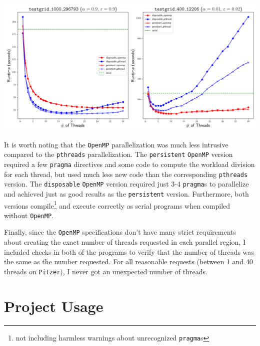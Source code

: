 \documentclass{article}
\begin{document}
\vspace{1em}
\begin{minipage}{\linewidth}
    \centering
    \includegraphics[width=.8\linewidth]{../results/plot.png}


    \label{fig:runtimes}
\end{minipage}

It is worth noting that the \texttt{OpenMP} parallelization was much less
intrusive compared to the \texttt{pthreads} parallelization. The
\texttt{persistent} \texttt{OpenMP} version required a few \texttt{pragma}
directives and some code to compute the workload division for each thread, but
used much less new code than the corresponding \texttt{pthreads} version.  The
\texttt{disposable} \texttt{OpenMP} version required just 3-4 \texttt{pragma}s
to parallelize and achieved just as good results as the \texttt{persistent}
version. Furthermore, both versions compile\footnote{not including harmless
warnings about unrecognized \texttt{pragma}s} and execute correctly as serial
programs when compiled without \texttt{OpenMP}.

Finally, since the \texttt{OpenMP} specifications don't have many strict
requirements about creating the exact number of threads requested in each
parallel region, I included checks in both of the programs to verify that the
number of threads was the same as the number requested. For all reasonable
requests (between 1 and 40 threads on \texttt{Pitzer}), I never got an
unexpected number of threads.

\section*{Project Usage}
\label{sec:project}
\end{document}
